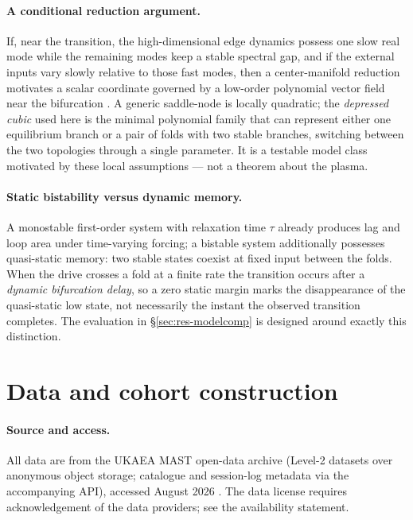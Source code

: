 \documentclass[11pt]{article}
\begin{document}
\paragraph{A conditional reduction argument.} If, near the transition, the
high-dimensional edge dynamics possess one slow real mode while the
remaining modes keep a stable spectral gap, and if the external inputs
vary slowly relative to those fast modes, then a center-manifold reduction
motivates a scalar coordinate governed by a low-order polynomial vector
field near the bifurcation \citep{kuznetsov2004elements}. A generic
saddle-node is locally quadratic; the \emph{depressed cubic} used here is
the minimal polynomial family that can represent either one equilibrium
branch or a pair of folds with two stable branches, switching between the
two topologies through a single parameter. It is a testable model class
motivated by these local assumptions --- not a theorem about the plasma.

\paragraph{Static bistability versus dynamic memory.} A monostable
first-order system with relaxation time $\tau$ already produces lag and
loop area under time-varying forcing; a bistable system additionally
possesses quasi-static memory: two stable states coexist at fixed input
between the folds. When the drive crosses a fold at a finite rate the
transition occurs after a \emph{dynamic bifurcation delay}, so a
zero static margin marks the disappearance of the quasi-static low state,
not necessarily the instant the observed transition completes. The
evaluation in \S\ref{sec:res-modelcomp} is designed around exactly this
distinction.

\section{Data and cohort construction}
\label{sec:data}

\paragraph{Source and access.} All data are from the UKAEA MAST open-data
archive (Level-2 datasets over anonymous object storage; catalogue and
session-log metadata via the accompanying API), accessed August 2026
\citep{mastopendata}. The data license requires acknowledgement of the
data providers; see the availability statement.
\end{document}
